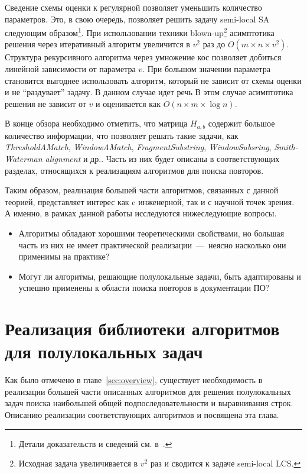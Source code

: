 Сведение схемы оценки к регулярной позволяет уменьшить количество параметров.
Это, в свою очередь, позволяет решить задачу semi-local SA следующим образом\footnote{Детали доказательств и сведений см. в~\cite{tiskin2006all}.}. 
При использовании техники blown-up\footnote{Исходная задача увеличивается в $v^2$ раз и сводится к задаче semi-local LCS.} асимптотика решения через итеративный алгоритм увеличится в $v^2$ раз до $O(m \times n \times v^2)$.
Структура рекурсивного алгоритма через умножение кос позволяет добиться линейной зависимости от параметра $v$. 
При большом значении параметра становится выгоднее использовать алгоритм, который не зависит от схемы оценки и не ``раздувает'' задачу. 
В данном случае идет речь 
В этом случае асимптотика решения не зависит от $v$ и оценивается как $O(n \times m \times \log n)$.

В конце обзора необходимо отметить, что матрица $H_{a,b}$ содержит большое количество информации, что позволяет решать такие задачи, как \emph{ThresholdAMatch}, \emph{WindowAMatch}, \emph{FragmentSubstring}, \emph{WindowSubsring}, \emph{Smith-Waterman alignment} и др.. 
Часть из них будет описаны в соответствующих разделах, относящихся к реализациям алгоритмов для поиска повторов.

Таким образом, реализация большей части алгоритмов, связанных с данной теорией, представляет интерес как c инженерной, так и с научной точек зрения.
А именно, в рамках данной работы исследуются нижеследующие вопросы.
\begin{itemize}
\item Алгоритмы обладают хорошими теоретическими свойствами, но большая часть из них не имеет практической реализации~---~неясно насколько они применимы на практике?
\item Могут ли алгоритмы, решающие полулокальные задачи, быть адаптированы и успешно применены к области поиска повторов в документации ПО?
\end{itemize}



\section{Реализация библиотеки алгоритмов для полулокальных задач}\label{librarySection}
Как было отмечено %
в главе~\ref{sec:overview},
существует необходимость в реализации большей части описанных алгоритмов для решения полулокальных задач поиска наибольшей общей подпоследовательности и выравнивания строк.
Описанию реализации соответствующих алгоритмов и посвящена эта глава.

